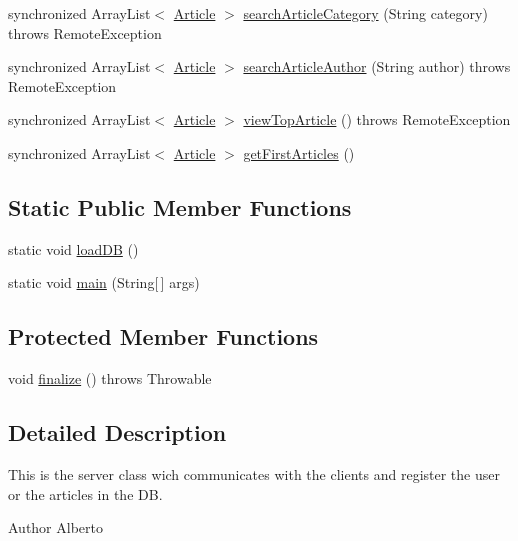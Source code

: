 \begin{DoxyCompactItemize}
synchronized Array\+List$<$ \hyperlink{classes_1_1deusto_1_1server_1_1jdo_1_1_article}{Article} $>$ \hyperlink{classes_1_1deusto_1_1server_1_1_server_ab2729689bb71bd707881b563cdf2a006}{search\+Article\+Category} (String category)  throws Remote\+Exception 
\item 
synchronized Array\+List$<$ \hyperlink{classes_1_1deusto_1_1server_1_1jdo_1_1_article}{Article} $>$ \hyperlink{classes_1_1deusto_1_1server_1_1_server_a5f04113ce0c895e13e1bde76d7b41eb8}{search\+Article\+Author} (String author)  throws Remote\+Exception 
\item 
synchronized Array\+List$<$ \hyperlink{classes_1_1deusto_1_1server_1_1jdo_1_1_article}{Article} $>$ \hyperlink{classes_1_1deusto_1_1server_1_1_server_ada6d55bcd79444de821eaeb6b21c44b8}{view\+Top\+Article} ()  throws Remote\+Exception 
\item 
synchronized Array\+List$<$ \hyperlink{classes_1_1deusto_1_1server_1_1jdo_1_1_article}{Article} $>$ \hyperlink{classes_1_1deusto_1_1server_1_1_server_a64dfcee7821b0cc581367c1b21d9f97f}{get\+First\+Articles} ()
\end{DoxyCompactItemize}
\subsection*{Static Public Member Functions}
\begin{DoxyCompactItemize}
\item 
static void \hyperlink{classes_1_1deusto_1_1server_1_1_server_a0517d84248cdc6489471f9e274b6d983}{load\+DB} ()
\item 
static void \hyperlink{classes_1_1deusto_1_1server_1_1_server_a750bb0d7dbd89246a3602f2e20d03fb5}{main} (String\mbox{[}$\,$\mbox{]} args)
\end{DoxyCompactItemize}
\subsection*{Protected Member Functions}
\begin{DoxyCompactItemize}
\item 
void \hyperlink{classes_1_1deusto_1_1server_1_1_server_a168b866b961a3d54b38834db9b52ca80}{finalize} ()  throws Throwable 
\end{DoxyCompactItemize}


\subsection{Detailed Description}
This is the server class wich communicates with the clients and register the user or the articles in the DB. \begin{DoxyAuthor}{Author}
Alberto 
\end{DoxyAuthor}


